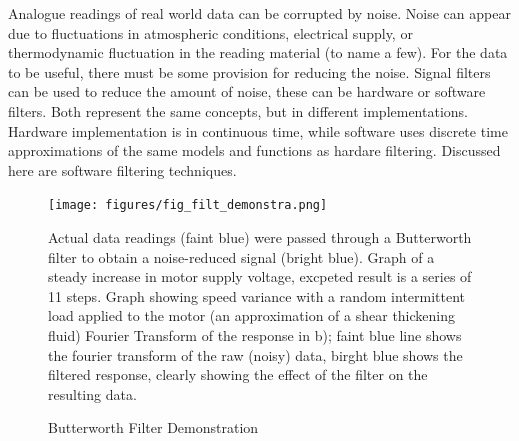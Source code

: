 \documentclass[twoside,a4]{report}
\def\br{\newline \newline \noindent}
\begin{document}
Analogue readings of real world data can be corrupted by noise. Noise can appear due to fluctuations in atmospheric conditions, electrical supply, or thermodynamic fluctuation in the reading material (to name a few). For the data to be useful, there must be some provision for reducing the noise. Signal filters can be used to reduce the amount of noise, these can be hardware or software filters. Both represent the same concepts, but in different implementations. Hardware implementation is in continuous time, while software uses discrete time approximations of the same models and functions as hardare filtering. Discussed here are software filtering techniques. \br


\begin{figure}[!htb]
	{\centering
	\texttt{[image: figures/fig\_filt\_demonstra.png]}
	\caption{Butterworth Filter Demonstration}
	\label{figfilterdemon}}
	{\footnotesize Actual data readings (faint blue) were passed through a Butterworth filter to obtain a noise-reduced signal (bright blue). Graph of a steady increase in motor supply voltage, excpeted result is a series of 11 steps. Graph showing speed variance with a random intermittent load applied to the motor (an approximation of a shear thickening fluid) Fourier Transform of the response in b); faint blue line shows the fourier transform of the raw (noisy) data, birght blue shows the filtered response, clearly showing the effect of the filter on the resulting data.}
\end{figure}
\end{document}
